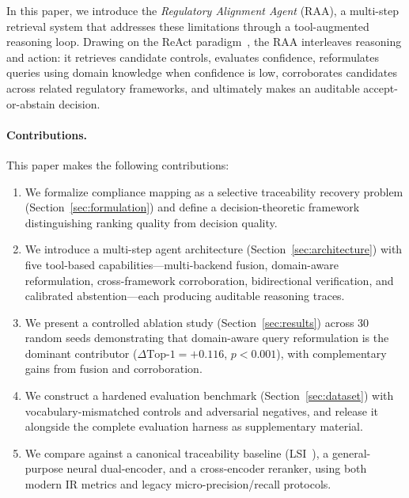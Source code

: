 \documentclass{sn-jnl}
\begin{document}
In this paper, we introduce the \emph{Regulatory Alignment Agent} (RAA), a multi-step retrieval system that addresses these limitations through a tool-augmented reasoning loop.
Drawing on the ReAct paradigm~\cite{Yao2023}, the RAA interleaves reasoning and action: it retrieves candidate controls, evaluates confidence, reformulates queries using domain knowledge when confidence is low, corroborates candidates across related regulatory frameworks, and ultimately makes an auditable accept-or-abstain decision.

\paragraph{Contributions.}
This paper makes the following contributions:
\begin{enumerate}
    \item We formalize compliance mapping as a selective traceability recovery problem (Section~\ref{sec:formulation}) and define a decision-theoretic framework distinguishing ranking quality from decision quality.

    \item We introduce a multi-step agent architecture (Section~\ref{sec:architecture}) with five tool-based capabilities---multi-backend fusion, domain-aware reformulation, cross-framework corroboration, bidirectional verification, and calibrated abstention---each producing auditable reasoning traces.

    \item We present a controlled ablation study (Section~\ref{sec:results}) across 30 random seeds demonstrating that domain-aware query reformulation is the dominant contributor ($\Delta\text{Top-1} = +0.116$, $p < 0.001$), with complementary gains from fusion and corroboration.

    \item We construct a hardened evaluation benchmark (Section~\ref{sec:dataset}) with vocabulary-mismatched controls and adversarial negatives, and release it alongside the complete evaluation harness as supplementary material.

    \item We compare against a canonical traceability baseline (LSI~\cite{MarcusMaletic2003}), a general-purpose neural dual-encoder, and a cross-encoder reranker, using both modern IR metrics and legacy micro-precision/recall protocols.
\end{enumerate}


\end{document}
